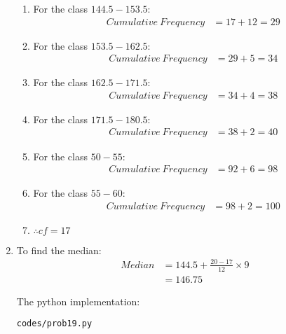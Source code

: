 \begin{enumerate}
\begin{enumerate}
\item For the class $144.5-153.5$:
\begin{align*}
Cumulative\ Frequency &= 17 + 12 = 29  
\end{align*}

\item For the class $153.5-162.5$:
\begin{align*}
Cumulative\ Frequency &= 29 + 5 = 34
\end{align*}

\item For the class $162.5-171.5$:
\begin{align*}
Cumulative\ Frequency &= 34 + 4 = 38
\end{align*}

\item For the class $171.5-180.5$:
\begin{align*}
Cumulative\ Frequency &= 38 + 2 = 40
\end{align*}

\item For the class $50-55$:
\begin{align*}
Cumulative\ Frequency &= 92 + 6 = 98
\end{align*}

\item For the class $55-60$:
\begin{align*}
Cumulative\ Frequency &= 98 + 2 = 100
\end{align*}

\item $\therefore cf = 17 $
\end{enumerate}

\item To find the median:
\begin{align*}
Median &= 144.5 + \frac{20 - 17}{12} \times 9\\
&= 146.75
\end{align*}

The python implementation:
\begin{lstlisting}
codes/prob19.py
\end{lstlisting}

\end{enumerate}
